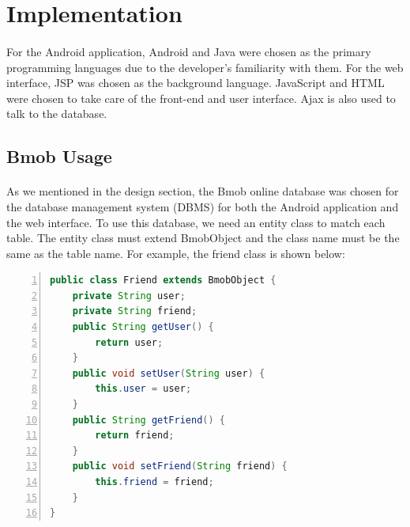 \section{Implementation}												
\label{sec:Implementation}

\paragraph{}For the Android application, Android and Java were chosen as the primary programming languages due to the developer's familiarity with them. For the web interface, JSP was chosen as the background language. JavaScript and HTML were chosen to take care of the front-end and user interface. Ajax is also used to talk to the database. 

\subsection{Bmob Usage}
\label{subsec:DatabaseOperations}
\paragraph{}As we mentioned in the design section, the Bmob online database was chosen for the database management system (DBMS) for both the Android application and the web interface. To use this database, we need an entity class to match each table. The entity class must extend {\ttfamily BmobObject} and the class name must be the same as the table name. For example, the friend class is shown below:

\begin{center}
\begin{lstlisting}[caption={Friend Class},language={java},
        numbers=left,basicstyle=\footnotesize\ttfamily,xleftmargin=.2\textwidth, xrightmargin=.2\textwidth]
public class Friend extends BmobObject {
    private String user;
    private String friend;
    public String getUser() {
        return user;
    }
    public void setUser(String user) {
        this.user = user;
    }
    public String getFriend() {
        return friend;
    }
    public void setFriend(String friend) {
        this.friend = friend;
    }
}
\end{lstlisting} 
\end{center}


